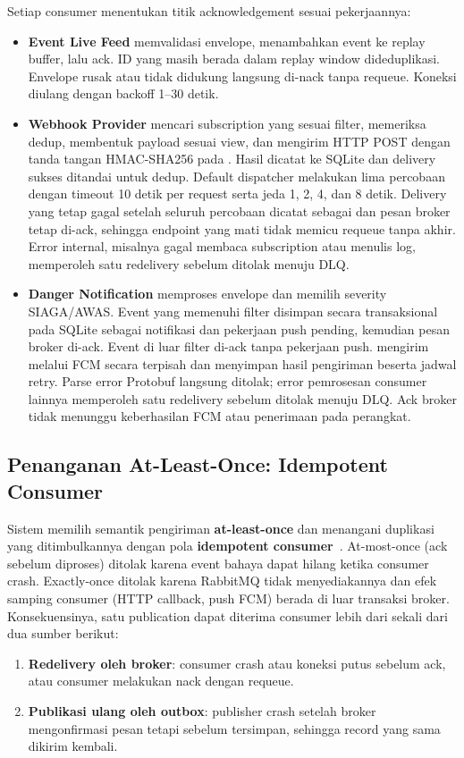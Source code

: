 Setiap consumer menentukan titik acknowledgement sesuai pekerjaannya:
\begin{itemize}
    \item \textbf{Event Live Feed} memvalidasi envelope, menambahkan event
    ke replay buffer, lalu ack. ID yang masih berada dalam replay window
    dideduplikasi. Envelope rusak atau tidak didukung langsung di-nack
    tanpa requeue. Koneksi diulang dengan backoff 1--30 detik.
    \item \textbf{Webhook Provider} mencari subscription yang sesuai filter,
    memeriksa dedup, membentuk payload sesuai view, dan mengirim HTTP POST
    dengan tanda tangan HMAC-SHA256 pada .
    Hasil dicatat ke SQLite dan delivery sukses ditandai untuk dedup.
    Default dispatcher melakukan lima percobaan dengan timeout 10 detik
    per request serta jeda 1, 2, 4, dan 8 detik. Delivery yang tetap gagal
    setelah seluruh percobaan dicatat sebagai  dan pesan broker
    tetap di-ack, sehingga endpoint yang mati tidak memicu requeue tanpa
    akhir. Error internal, misalnya gagal membaca subscription atau menulis
    log, memperoleh satu redelivery sebelum ditolak menuju DLQ.
    \item \textbf{Danger Notification} memproses envelope dan memilih severity
    SIAGA/AWAS. Event yang memenuhi filter disimpan secara transaksional
    pada SQLite sebagai notifikasi dan pekerjaan push pending, kemudian
    pesan broker di-ack. Event di luar filter di-ack tanpa pekerjaan push.
     mengirim melalui FCM secara terpisah dan
    menyimpan hasil pengiriman beserta jadwal retry. Parse error Protobuf
    langsung ditolak; error pemrosesan consumer lainnya memperoleh satu
    redelivery sebelum ditolak menuju DLQ. Ack broker tidak menunggu
    keberhasilan FCM atau penerimaan pada perangkat.
\end{itemize}

\subsection{Penanganan At-Least-Once: Idempotent Consumer}

Sistem memilih semantik pengiriman \textbf{at-least-once} dan menangani
duplikasi yang ditimbulkannya dengan pola \textbf{idempotent consumer}~\cite{idempotent}.
At-most-once (ack sebelum diproses) ditolak karena event bahaya dapat hilang
ketika consumer crash. Exactly-once ditolak karena RabbitMQ tidak menyediakannya
dan efek samping consumer (HTTP callback, push FCM) berada di luar transaksi
broker. Konsekuensinya, satu publication dapat diterima consumer lebih dari
sekali dari dua sumber berikut:
\begin{enumerate}
    \item \textbf{Redelivery oleh broker}: consumer crash atau koneksi putus
    sebelum ack, atau consumer melakukan nack dengan requeue.
    \item \textbf{Publikasi ulang oleh outbox}: publisher crash setelah broker
    mengonfirmasi pesan tetapi sebelum  tersimpan, sehingga
    record yang sama dikirim kembali.
\end{enumerate}

